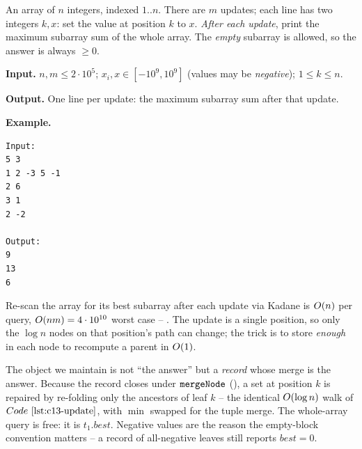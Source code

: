 \begin{problemstatement}
An array of \(n\) integers, indexed \(1..n\).  There are \(m\) updates; each
line has two integers \(k,x\): set the value at position \(k\) to \(x\).
\emph{After each update}, print the maximum subarray sum of the whole array.
The \emph{empty} subarray is allowed, so the answer is always \(\ge 0\).

\textbf{Input.} \(n,m\le 2\cdot10^5\); \(x_i,x\in[-10^9,10^9]\) (values may be
\emph{negative}); \(1\le k\le n\).

\textbf{Output.} One line per update: the maximum subarray sum after that update.

\textbf{Example.}
\begin{verbatim}
Input:
5 3
1 2 -3 5 -1
2 6
3 1
2 -2

Output:
9
13
6
\end{verbatim}
\end{problemstatement}

\begin{attemptgate}
Re-scan the array for its best subarray after each update via Kadane is
\(O(n)\) per query, \(O(nm)=4\cdot10^{10}\) worst case -- \tle.  The
update is a single position, so only the \(\log n\) nodes on that position's
path can change; the trick is to store \emph{enough} in each node to recompute
a parent in \(O(1)\).
\end{attemptgate}

The object we maintain is not ``the answer'' but a \emph{record} whose merge is
the answer.  Because the record closes under \(\texttt{mergeNode}\)
(), a set at position \(k\) is repaired by re-folding only
the ancestors of leaf \(k\) -- the identical \(O(\log n)\) walk of
\(\coderef{c13-update}\), with \(\min\) swapped for the tuple merge.  The
whole-array query is free: it is \(t_1.\mathit{best}\).  Negative values are the
reason the empty-block convention matters -- a record of all-negative leaves
still reports \(\mathit{best}=0\).


